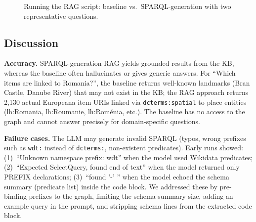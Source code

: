 \documentclass[11pt,a4paper]{article}
\begin{document}
  \begin{figure}[ht]
  \centering
  \caption{Running the RAG script: baseline vs.\ SPARQL-generation with two representative questions.}
  \label{fig:rag_screenshot}
  \end{figure}

  \subsection{Discussion}

  \textbf{Accuracy.} SPARQL-generation RAG yields grounded results from the KB, whereas the baseline often hallucinates or gives generic answers. For ``Which items are linked to Romania?'', the baseline returns well-known landmarks (Bran Castle, Danube River) that may not exist in the KB; the RAG approach returns 2,130 actual Europeana item URIs linked via \texttt{dcterms:spatial} to place entities (lh:Romania, lh:Roumanie, lh:Roménia, etc.). The baseline has no access to the graph and cannot answer precisely for domain-specific questions.

  \textbf{Failure cases.} The LLM may generate invalid SPARQL (typos, wrong prefixes such as \texttt{wdt:} instead of \texttt{dcterms:}, non-existent predicates). Early runs showed: (1)~``Unknown namespace prefix: wdt'' when the model used Wikidata predicates; (2)~``Expected SelectQuery, found end of text'' when the model returned only PREFIX declarations; (3)~``found '-' '' when the model echoed the schema summary (predicate list) inside the code block. We addressed these by pre-binding prefixes to the graph, limiting the schema summary size, adding an example query in the prompt, and stripping schema lines from the extracted code block.
\end{document}
